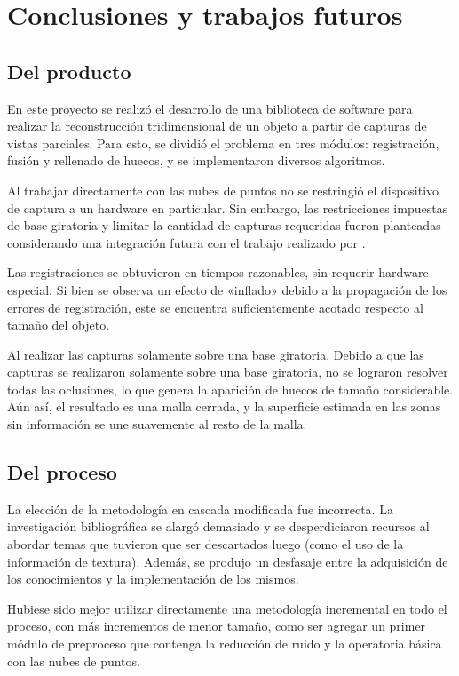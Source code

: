 \chapter{Conclusiones y trabajos futuros}
\section{Del producto}
	En este proyecto se realizó el desarrollo de una biblioteca de software para
	realizar la reconstrucción tridimensional de un objeto a partir de capturas de
	vistas parciales.
	Para esto, se dividió el problema en tres módulos: registración, fusión y
	rellenado de huecos, y se implementaron diversos algoritmos.

	Al trabajar directamente con las nubes de puntos no se restringió el
	dispositivo de captura a un hardware en particular. Sin embargo, las
	restricciones impuestas de base giratoria y limitar la cantidad de capturas
	requeridas fueron planteadas considerando una integración futura con
	el trabajo realizado por .

	Las registraciones se obtuvieron en tiempos razonables, sin requerir hardware especial.
	Si bien se observa un efecto de «inflado» debido a la propagación de los errores de registración,
	este se encuentra suficientemente acotado respecto al tamaño del objeto.

	Al realizar las capturas solamente sobre una base giratoria,
	Debido a que las capturas se realizaron solamente sobre una base giratoria,
	no se lograron resolver todas las oclusiones, lo que genera la aparición de huecos de
	tamaño considerable.
	Aún así, el resultado es una malla cerrada, y la
	superficie estimada en las zonas sin información se une suavemente al resto de
	la malla.

\section{Del proceso}
La elección de la metodología en cascada modificada fue incorrecta.
La investigación bibliográfica se alargó demasiado y se desperdiciaron recursos
al abordar temas que tuvieron que ser descartados luego (como el uso de la
información de textura).
Además, se produjo un desfasaje entre la adquisición de los conocimientos y la
implementación de los mismos.

Hubiese sido mejor utilizar directamente una metodología incremental en todo el
proceso, con más incrementos de menor tamaño, como ser agregar un primer módulo
de preproceso que contenga la reducción de ruido y la operatoria básica con las
nubes de puntos.

